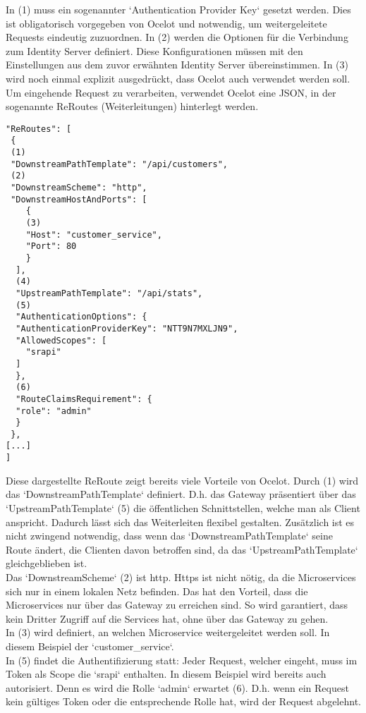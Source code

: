 In (1) muss ein sogenannter `Authentication Provider Key` gesetzt werden. Dies ist obligatorisch vorgegeben von Ocelot und notwendig, um weitergeleitete Requests eindeutig zuzuordnen. In (2) werden die Optionen für die Verbindung zum Identity Server definiert. Diese Konfigurationen müssen mit den Einstellungen aus dem zuvor erwähnten Identity Server übereinstimmen. In (3) wird noch einmal explizit ausgedrückt, dass Ocelot auch verwendet werden soll. \\

Um eingehende Request zu verarbeiten, verwendet Ocelot eine JSON, in der sogenannte ReRoutes (Weiterleitungen) hinterlegt werden. 

\begin{verbatim}
"ReRoutes": [
 {
 (1)
 "DownstreamPathTemplate": "/api/customers",
 (2)
 "DownstreamScheme": "http",
 "DownstreamHostAndPorts": [
    {
    (3)
    "Host": "customer_service",
    "Port": 80
    }
  ],
  (4)
  "UpstreamPathTemplate": "/api/stats",
  (5)
  "AuthenticationOptions": {
  "AuthenticationProviderKey": "NTT9N7MXLJN9",
  "AllowedScopes": [
    "srapi"
  ]
  },
  (6)
  "RouteClaimsRequirement": {
  "role": "admin"
  }
 },
[...]
]
\end{verbatim}

Diese dargestellte ReRoute zeigt bereits viele Vorteile von Ocelot. Durch (1) wird das `DownstreamPathTemplate` definiert. D.h. das Gateway präsentiert über das `UpstreamPathTemplate` (5) die öffentlichen Schnittstellen, welche man als Client anspricht. Dadurch lässt sich das Weiterleiten flexibel gestalten. Zusätzlich ist es nicht zwingend notwendig, dass wenn das `DownstreamPathTemplate` seine Route ändert, die Clienten davon betroffen sind, da das `UpstreamPathTemplate` gleichgeblieben ist. \\

Das `DownstreamScheme` (2) ist http. Https ist nicht nötig, da die Microservices sich nur in einem lokalen Netz befinden. Das hat den Vorteil, dass die Microservices nur über das Gateway zu erreichen sind. So wird garantiert, dass kein Dritter Zugriff auf die Services hat, ohne über das Gateway zu gehen. \\

In (3) wird definiert, an welchen Microservice weitergeleitet werden soll. In diesem Beispiel der `customer\_service`.\\

In (5) findet die Authentifizierung statt: Jeder Request, welcher eingeht, muss im Token als Scope die `srapi` enthalten. In diesem Beispiel wird bereits auch autorisiert. Denn es wird die Rolle `admin` erwartet (6). D.h. wenn ein Request kein gültiges Token oder die entsprechende Rolle hat, wird der Request abgelehnt. \\

